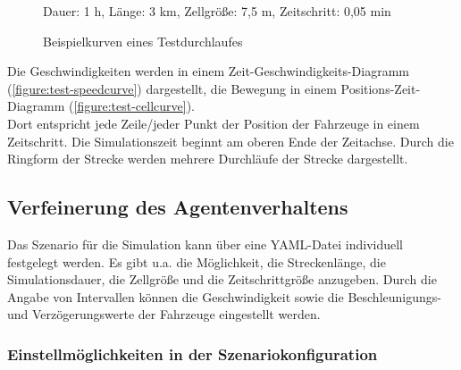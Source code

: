 \begin{figure}[hptb]
  \centering 
   \qquad
  \caption{Beispielkurven eines Testdurchlaufes}{\footnotesize Dauer: 1 h, Länge: 3 km, Zellgröße: 7,5 m, Zeitschritt: 0,05 min} 
  \label{figure:test-cell-speedcurves}
\end{figure}

Die Geschwindigkeiten werden in einem Zeit-Geschwindigkeits-Diagramm (\cref{figure:test-speedcurve}) dargestellt, die Bewegung in einem Positions-Zeit-Diagramm (\cref{figure:test-cellcurve}).
\\
Dort entspricht jede Zeile/jeder Punkt der Position der Fahrzeuge in einem Zeitschritt.
Die Simulationszeit beginnt am oberen Ende der Zeitachse.
Durch die Ringform der Strecke werden mehrere Durchläufe der Strecke dargestellt.






\subsection{Verfeinerung des Agentenverhaltens}
\label{sec:verfeinerung-agentenplan}

Das Szenario für die Simulation kann über eine YAML-Datei individuell festgelegt werden.
Es gibt u.a. die Möglichkeit, die Streckenlänge, die Simulationsdauer, die Zellgröße und die Zeitschrittgröße anzugeben. 
Durch die Angabe von Intervallen können die Geschwindigkeit sowie die Beschleunigungs- und Verzögerungswerte der Fahrzeuge eingestellt werden.



\subsubsection{Einstellmöglichkeiten in der Szenariokonfiguration}
\label{einstellungen-szenario}


